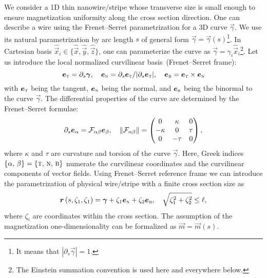 We consider a 1D thin nanowire/stripe whose transverse size is small enough to ensure magnetization uniformity along the cross section direction. One can describe a wire using the Frenet--Serret parametrization for a 3D curve $\vec{\gamma}$. We use its natural parametrization by arc length $s$ of general form $\vec{\gamma}=\vec{\gamma}(s)$\footnote{It means that $|\partial_s\vec{\gamma}|=1$.}. In Cartesian basis $\hat{\vec{x}}_i\in\{\hat{\vec{x}},\hat{\vec{y}},\hat{\vec{z}}\}$, one can parameterize the curve as $\vec{\gamma}=\gamma_i\hat{\vec{x}}_i$\footnote{The Einstein summation convention is used here and everywhere below.}. Let
us introduce the local normalized curvilinear basis~(Frenet--Serret frame):
\begin{equation}\label{eq:FrenetSerret_basis}
	\vec{e}_\textsc{t}=\partial_s \vec{\gamma},\quad \vec{e}_\textsc{n}=\partial_s\vec{e}_\textsc{t}/|\partial_s\vec{e}_\textsc{t}|,\quad \vec{e}_\textsc{b}=\vec{e}_\textsc{t}\times\vec{e}_\textsc{n}
\end{equation}
with $\vec{e}_\textsc{t}$ being the tangent, $\vec{e}_\textsc{n}$ being the normal, and $\vec{e}_\textsc{b}$ being the binormal to the curve $\vec{\gamma}$. The differential properties of the curve are determined by the Frenet--Serret formulae:
\begin{equation}\notag
	\partial_s\vec{e}_\alpha = \mathcal{F}_{\alpha\beta}\vec{e}_\beta,\quad \|\mathcal{F}_{\alpha\beta}\|=\left(
		\begin{matrix}
			0&\kappa&0\\
			-\kappa&0&\tau\\
			0&-\tau&0
		\end{matrix}\right),
\end{equation}
where $\kappa$ and $\tau$ are curvature and torsion of the curve $\vec{\gamma}$. Here, Greek indices $\{\alpha,\, \beta\} = \{\textsc{t},\, \textsc{n},\, \textsc{b}\}$ numerate the curvilinear coordinates and the curvilinear components of vector fields.
Using Frenet--Serret reference frame we can introduce the parametrization of physical wire/stripe with a finite cross section size as
\begin{equation}\notag
\vec{r}\left(s,\zeta_1,\zeta_1\right)=\vec{\gamma}+\zeta_1\vec{e}_\textsc{n}+\zeta_2\vec{e}_\textsc{b},\quad \sqrt{\zeta_1^2+\zeta_2^2}\leq \ell,
\end{equation}
where $\zeta_i$ are coordinates within the cross section. The assumption of the magnetization one-dimensionality can be formalized as $\vec{m}=\vec{m}(s)$.

